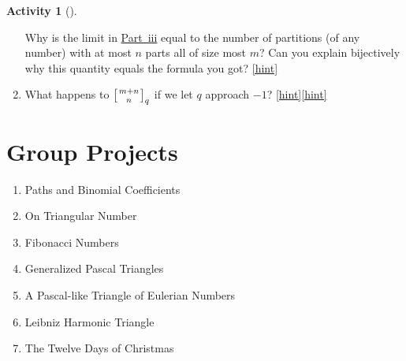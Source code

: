 \documentclass[10pt,]{book}
\theoremstyle{plain}
\theoremstyle{definition}
\theoremstyle{definition}
\theoremstyle{definition}
\newtheorem{activity}[project]{Activity}
\numberwithin{equation}{chapter}
\newcommand{\qchoose}[2]{\left[{#1\atop#2}\right]_q}
\begin{document}
\begin{activity}[]
\begin{enumerate}[font=\bfseries,label=(\alph*),ref=\alph*]
\begin{enumerate}[label=(\roman*)]
\end{enumerate}
 Why is the limit in \hyperlink{q-binomial-lim}{Part~iii} equal to the number of partitions (of any number) with at most \(n\) parts all of size most \(m\)? Can you explain bijectively why this quantity equals the formula you got?%
\hfill{\tiny\hyperlink{a-327.g}{[hint]}\hypertarget{q-327.g}{}}\item\label{task-289} \hypertarget{p-1642}{}%
What happens to \(\qchoose{m+n}{n}\) if we let \(q\) approach \(-1\)?%
\hfill{\tiny\hyperlink{a-327.h}{[hint]}\hypertarget{q-327.h}{}}\hfill{\tiny\hyperlink{a-327.h}{[hint]}\hypertarget{q-327.h}{}}\end{enumerate}
\end{activity}
%
%
%
\appendix
%
\typeout{************************************************}
\typeout{************************************************}
\chapter[{Group Projects}]{Group Projects}\label{app_projects}
\hypertarget{p-1650}{}%
\leavevmode%
\begin{enumerate}
\item\hypertarget{li-70}{}Paths and Binomial Coefficients%
\item\hypertarget{li-71}{}On Triangular Number%
\item\hypertarget{li-72}{}Fibonacci Numbers%
\item\hypertarget{li-73}{}Generalized Pascal Triangles%
\item\hypertarget{li-74}{}A Pascal-like Triangle of Eulerian Numbers%
\item\hypertarget{li-75}{}Leibniz Harmonic Triangle%
\item\hypertarget{li-76}{}The Twelve Days of Christmas%
\end{enumerate}
%
\typeout{************************************************}
\typeout{************************************************}
\end{document}
